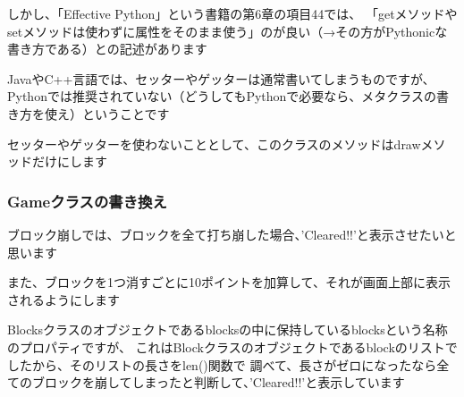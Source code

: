 \documentclass[uplatex,a4paper,11pt,oneside,openany]{jsbook}
\begin{document}
しかし、「Effective Python」という書籍の第6章の項目44では、
「getメソッドやsetメソッドは使わずに属性をそのまま使う」のが良い（→その方がPythonicな書き方である）との記述があります

JavaやC++言語では、セッターやゲッターは通常書いてしまうものですが、Pythonでは推奨されていない（どうしてもPythonで必要なら、メタクラスの書き方を使え）ということです

セッターやゲッターを使わないこととして、このクラスのメソッドはdrawメソッドだけにします

\subsubsection{Gameクラスの書き換え}

ブロック崩しでは、ブロックを全て打ち崩した場合、'Cleared!!'と表示させたいと思います

また、ブロックを1つ消すごとに10ポイントを加算して、それが画面上部に表示されるようにします

Blocksクラスのオブジェクトであるblocksの中に保持しているblocksという名称のプロパティですが、
これはBlockクラスのオブジェクトであるblockのリストでしたから、そのリストの長さをlen()関数で
調べて、長さがゼロになったなら全てのブロックを崩してしまったと判断して、'Cleared!!'と表示しています
\end{document}
